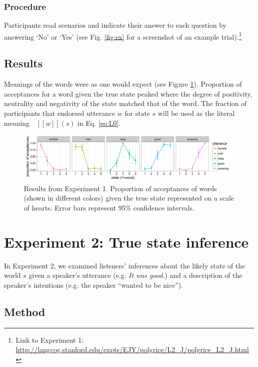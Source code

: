 \documentclass[10pt,letterpaper]{article}
\newcommand{\denote}[1]{\mbox{ $[\![ #1 ]\!]$}}
\begin{document}
\subsubsection{Procedure}

Participants read scenarios and indicate their answer to each question by answering `No' or `Yes' (see Fig. \ref{fig:ex} for a screenshot of an example trial).\footnote{Link to Experiment 1: \url{http://langcog.stanford.edu/expts/EJY/polgrice/L2_J/polgrice_L2_J.html}} 

\subsection{Results}

Meanings of the words were as one would expect (see Figure \ref{fig:exp1}). 
Proportion of acceptances for a word given the true state peaked where the degree of positivity, neutrality and negativity of the state matched that of the word. 
The fraction of participants that endorsed utterance $w$ for state $s$ will be used as the literal meaning $\denote{w}(s)$ in Eq. \ref{eq:L0}. 

\begin{figure}[tbh]
\begin{center} 
  \includegraphics[width=.9\textwidth]{figures/exp1.pdf}
  \caption{\label{fig:exp1} Results from Experiment 1. Proportion of acceptances of words (shown in different colors) given the true state represented on a scale of hearts. Error bars represent 95\% confidence intervals.}
  \end{center} 
\end{figure}

\section{Experiment 2: True state inference}
In Experiment 2, we examined listeners' inferences about the likely state of the world $s$ given a speaker's utterance (e.g. \emph{It was good.}) and a description of the speaker's intentions (e.g. the speaker ``wanted to be nice'').

\subsection{Method}
\end{document}
